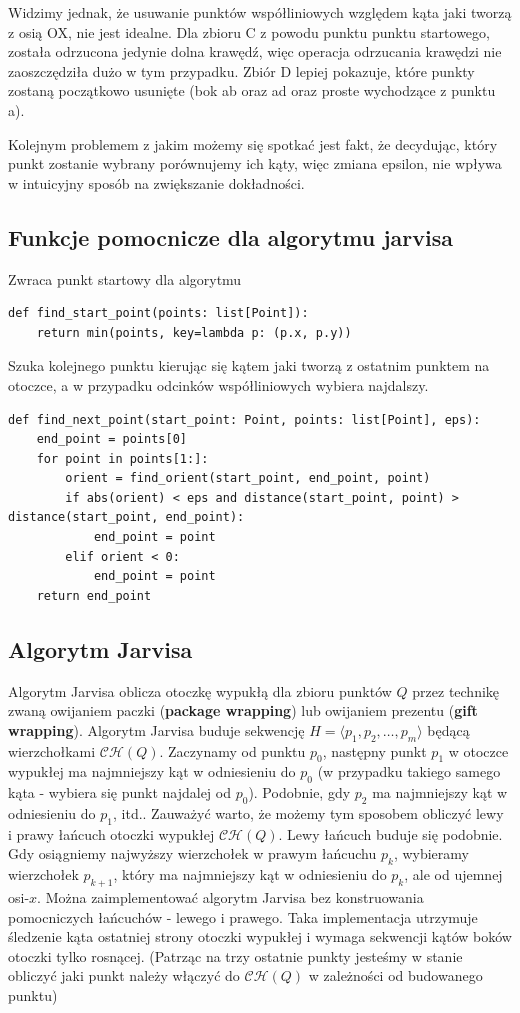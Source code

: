 \documentclass[12pt]{article}
\begin{document}
Widzimy jednak, że usuwanie punktów współliniowych względem kąta jaki tworzą z osią OX, nie jest idealne.
Dla zbioru C z powodu punktu punktu startowego, została odrzucona jedynie dolna krawędź, więc operacja odrzucania krawędzi nie zaoszczędziła dużo w tym przypadku. Zbiór D lepiej pokazuje, które punkty zostaną początkowo usunięte (bok ab oraz ad oraz proste wychodzące z punktu a).

Kolejnym problemem z jakim możemy się spotkać jest fakt, że decydując, który punkt zostanie wybrany porównujemy ich kąty, więc zmiana epsilon, nie wpływa w intuicyjny sposób na zwiększanie dokładności.
\newpage

\subsection*{Funkcje pomocnicze dla algorytmu jarvisa}
\par Zwraca punkt startowy dla algorytmu
\begin{Verbatim}
def find_start_point(points: list[Point]):
	return min(points, key=lambda p: (p.x, p.y))
\end{Verbatim}

\mbox{}
\par Szuka kolejnego punktu kierując się kątem jaki tworzą z ostatnim punktem na otoczce, a w przypadku odcinków współliniowych wybiera najdalszy.
\begin{Verbatim}
def find_next_point(start_point: Point, points: list[Point], eps):
	end_point = points[0]
	for point in points[1:]:
		orient = find_orient(start_point, end_point, point)
		if abs(orient) < eps and distance(start_point, point) > distance(start_point, end_point):
			end_point = point
		elif orient < 0:
			end_point = point
	return end_point
\end{Verbatim}


\subsection*{Algorytm Jarvisa}
Algorytm Jarvisa oblicza otoczkę wypukłą dla zbioru punktów $Q$ przez technikę zwaną owijaniem paczki (\textbf{package wrapping}) lub owijaniem prezentu (\textbf{gift wrapping}). Algorytm Jarvisa buduje sekwencję $H = \langle p_1, p_2, \dots, p_m \rangle$ będącą wierzchołkami $\mathcal{CH}(Q)$. Zaczynamy od punktu $p_0$, następny punkt $p_1$ w otoczce wypukłej ma najmniejszy kąt w odniesieniu do $p_0$ (w przypadku takiego samego kąta - wybiera się punkt najdalej od $p_0$). Podobnie, gdy $p_2$ ma najmniejszy kąt w odniesieniu do $p_1$, itd.. Zauważyć warto, że możemy tym sposobem obliczyć lewy i prawy łańcuch otoczki wypukłej $\mathcal{CH}(Q)$. Lewy łańcuch buduje się podobnie. Gdy osiągniemy najwyższy wierzchołek w prawym łańcuchu $p_k$, wybieramy wierzchołek $p_{k+1}$, który ma najmniejszy kąt w odniesieniu do $p_k$, ale od ujemnej osi-$x$. Można zaimplementować algorytm Jarvisa bez konstruowania pomocniczych łańcuchów - lewego i prawego. Taka implementacja utrzymuje śledzenie kąta ostatniej strony otoczki wypukłej i wymaga sekwencji kątów boków otoczki tylko rosnącej. (Patrząc na trzy ostatnie punkty jesteśmy w stanie obliczyć jaki punkt należy włączyć do $\mathcal{CH}(Q)$ w zależności od budowanego punktu)
\end{document}
